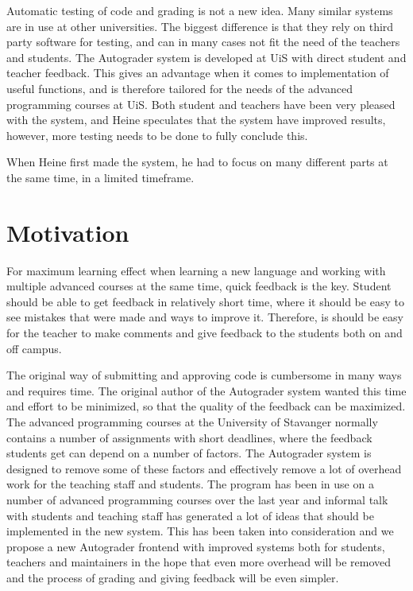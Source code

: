 Automatic testing of code and grading is not a new idea. Many similar systems are in use at other universities. The biggest difference is that they rely on third party software for testing, and can in many cases not fit the need of the teachers and students. The Autograder system is developed at UiS with direct student and teacher feedback. This gives an advantage when it comes to implementation of useful functions, and is therefore tailored for the needs of the advanced programming courses at UiS. Both student and teachers have been very pleased with the system, and Heine speculates that the system have improved results, however, more testing needs to be done to fully conclude this.

When Heine first made the system, he had to focus on many different parts at the same time, in a limited timeframe. 



\chapter{Motivation}
For maximum learning effect when learning a new language and working with multiple advanced courses at the same time, quick feedback is the key. Student should be able to get feedback in relatively short time, where it should be easy to see mistakes that were made and ways to improve it. Therefore, is should be easy for the teacher to make comments and give feedback to the students both on and off campus.

The original way of submitting and approving code is cumbersome in many ways and requires time. The original author of the Autograder system wanted this time and effort to be minimized, so that the quality of the feedback can be maximized. The advanced programming courses at the University of Stavanger normally contains a number of assignments with short deadlines, where the feedback students get can depend on a number of factors. The Autograder system is designed to remove some of these factors and effectively remove a lot of overhead work for the teaching staff and students. The program has been in use on a number of advanced programming courses over the last year and informal talk with students and teaching staff has generated a lot of ideas that should be implemented in the new system. This has been taken into consideration and we propose a new Autograder frontend with improved systems both for students, teachers and maintainers in the hope that even more overhead will be removed and the process of grading and giving feedback will be even simpler.




%
